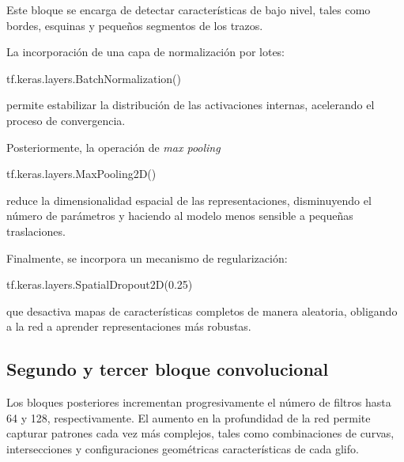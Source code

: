 \documentclass[
  spanish,
  us-letterpaper,
  DIV=11,
  numbers=noendperiod]{scrreprt}
\newenvironment{Shaded}{\begin{snugshade}}{\end{snugshade}}
\newcommand{\FloatTok}[1]{\textcolor[rgb]{0.68,0.00,0.00}{#1}}
\newcommand{\NormalTok}[1]{\textcolor[rgb]{0.00,0.23,0.31}{#1}}
\begin{document}
Este bloque se encarga de detectar características de bajo nivel, tales
como bordes, esquinas y pequeños segmentos de los trazos.

La incorporación de una capa de normalización por lotes:

\begin{Shaded}
\begin{Highlighting}[]
\NormalTok{tf.keras.layers.BatchNormalization()}
\end{Highlighting}
\end{Shaded}

permite estabilizar la distribución de las activaciones internas,
acelerando el proceso de convergencia.

Posteriormente, la operación de \emph{max pooling}

\begin{Shaded}
\begin{Highlighting}[]
\NormalTok{tf.keras.layers.MaxPooling2D()}
\end{Highlighting}
\end{Shaded}

reduce la dimensionalidad espacial de las representaciones, disminuyendo
el número de parámetros y haciendo al modelo menos sensible a pequeñas
traslaciones.

Finalmente, se incorpora un mecanismo de regularización:

\begin{Shaded}
\begin{Highlighting}[]
\NormalTok{tf.keras.layers.SpatialDropout2D(}\FloatTok{0.25}\NormalTok{)}
\end{Highlighting}
\end{Shaded}

que desactiva mapas de características completos de manera aleatoria,
obligando a la red a aprender representaciones más robustas.

\subsection{Segundo y tercer bloque
convolucional}\label{segundo-y-tercer-bloque-convolucional}

Los bloques posteriores incrementan progresivamente el número de filtros
hasta 64 y 128, respectivamente. El aumento en la profundidad de la red
permite capturar patrones cada vez más complejos, tales como
combinaciones de curvas, intersecciones y configuraciones geométricas
características de cada glifo.
\end{document}
